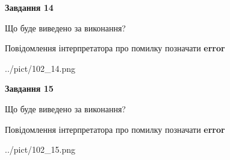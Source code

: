 \documentclass[11pt, ukrainian]{article}
\begin{document}
{\begin {large}
{\begin {center}\textbf{Завдання 14}\end {center}}\par
Що буде виведено за виконання? \par
Повідомлення інтерпретатора про помилку позначати \textbf{error}

\begin{center}
	{../pict/102_14.png}
\end{center}
\newpage

{\begin {center}\textbf{Завдання 15}\end {center}}\par
Що буде виведено за виконання? \par
Повідомлення інтерпретатора про помилку позначати \textbf{error}

\begin{center}
	{../pict/102_15.png}
\end{center}
\newpage

\end {large}}
\end{document}
